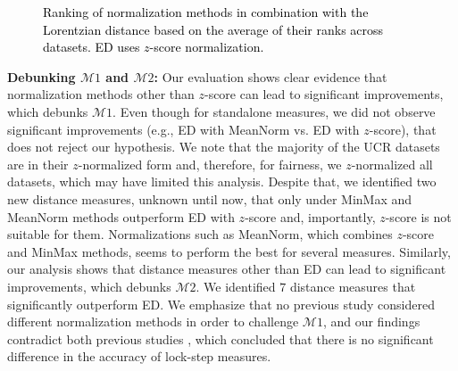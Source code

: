 \documentclass[11pt]{article}
\begin{document}
\begin{figure} \centering {}
\vspace{-0.3cm}
\caption{\textcolor{black}{Ranking of normalization methods in combination with the Lorentzian distance based on the average of their ranks across datasets. ED uses $z$-score normalization.}}
\label{john_fig:lorentziandifferentnorms}
\vspace{-0.2cm}
\end{figure}

\noindent \textbf{Debunking $\mathcal{M}1$ and $\mathcal{M}2$: } Our evaluation shows clear evidence that normalization methods other than $z$-score can lead to significant improvements, which debunks $\mathcal{M}1$. Even though for standalone measures, we did not observe significant improvements (e.g.,  ED with MeanNorm vs. ED with $z$-score), that does not reject our hypothesis. We note that the majority of the UCR datasets are in their $z$-normalized form and, therefore, for fairness, we $z$-normalized all datasets, which may have limited this analysis. Despite that, we identified two new distance measures, unknown until now, that only under MinMax and MeanNorm methods outperform ED with $z$-score and, importantly, $z$-score is not suitable for them. Normalizations such as MeanNorm, which combines $z$-score and MinMax methods, seems to perform the best for several measures. Similarly, our analysis shows that distance measures other than ED can lead to significant improvements, which debunks $\mathcal{M}2$. We identified $7$ distance measures that significantly outperform ED. We emphasize that no previous study considered different normalization methods in order to challenge $\mathcal{M}1$, and our findings contradict both previous studies \cite{ding2008querying,giusti2013empirical}, which concluded that there is no significant difference in the accuracy of lock-step measures.
\end{document}

